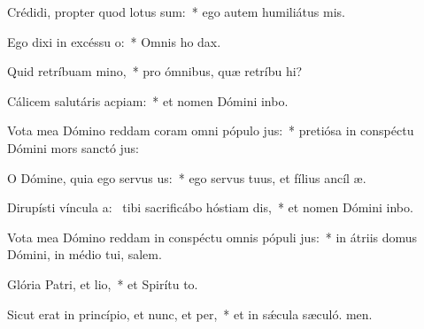 \item Crédidi, propter quod lotus sum:~* ego autem humiliátus  mis.
\item Ego dixi in excéssu o:~* Omnis ho dax.
\item Quid retríbuam mino,~* pro ómnibus, quæ retríbu hi?
\item Cálicem salutáris acpiam:~* et nomen Dómini inbo.
\item Vota mea Dómino reddam coram omni pópulo jus:~* pretiósa in conspéctu Dómini mors sanctó jus:
\item O Dómine, quia ego servus us:~* ego servus tuus, et fílius ancíl æ.
\item Dirupísti víncula a:~\pscross{} tibi sacrificábo hóstiam dis,~* et nomen Dómini inbo.
\item Vota mea Dómino reddam in conspéctu omnis pópuli jus:~* in átriis domus Dómini, in médio tui, salem.
\item Glória Patri, et lio,~* et Spirítu to.
\item Sicut erat in princípio, et nunc, et per,~* et in sǽcula sæculó. men.
